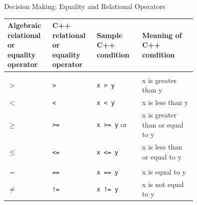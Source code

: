 \documentclass[10pt]{beamer}
\begin{document}
\begin{frame}{\small Decision Making: Equality and Relational Operators}
	\centering\tiny\renewcommand{\arraystretch}{2}
	\begin{tabular}{p{0.15\linewidth} p{0.15\linewidth} p{0.2\linewidth} p{0.25\linewidth}}
		
		\rowcolor{cyan}\color{white} Algebraic relational or equality operator & \color{white} C++ relational or equality operator & \color{white} Sample C++ condition & \color{white} Meaning of C++ condition \\\hline
		
		\rowcolor{lightcyan} \multicolumn{4}{l}{Relational operators} \\
		
		\rowcolor{lightcyan} $>$ & \texttt{>} & \texttt{x > y} & x is greater than y \\
		
		\rowcolor{lightcyan} $<$ & \texttt{<} & \texttt{x < y} & x is less than y \\
		
		\rowcolor{lightcyan} $\geq$ & \texttt{>=} & \texttt{x >= y} or & x is greater than or equal to y \\
		
		\rowcolor{lightcyan} $\leq$ & \texttt{<=} & \texttt{x <= y} & x is less than or equal to y \\\hline
		
		\rowcolor{lightcyan} \multicolumn{4}{l}{Equality operators} \\
		
		\rowcolor{lightcyan} $=$ & \texttt{==} & \texttt{x == y} & x is equal to y \\
		
		\rowcolor{lightcyan} $\neq$ & \texttt{!=} & \texttt{x != y} & x is not equal to y \\\hline
	\end{tabular}
\end{frame}


%
\end{document}
